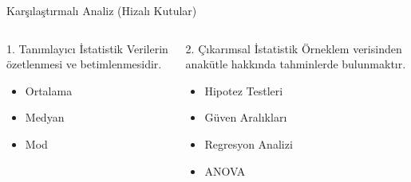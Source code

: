 % 

\begin{frame}{Karşılaştırmalı Analiz (Hizalı Kutular)}
    
    \begin{columns}[t] 
        
        \begin{block}{1. Tanımlayıcı İstatistik}
            Verilerin özetlenmesi ve betimlenmesidir.
            \begin{itemize}
                \item Ortalama
                \item Medyan
                \item Mod
            \end{itemize}
        \end{block}

        \begin{block}{2. Çıkarımsal İstatistik}
            Örneklem verisinden anakütle hakkında tahminlerde bulunmaktır.
            \begin{itemize}
                \item Hipotez Testleri
                \item Güven Aralıkları
                \item Regresyon Analizi
                \item ANOVA
            \end{itemize}
        \end{block}
        
    \end{columns}
    

\end{frame}
